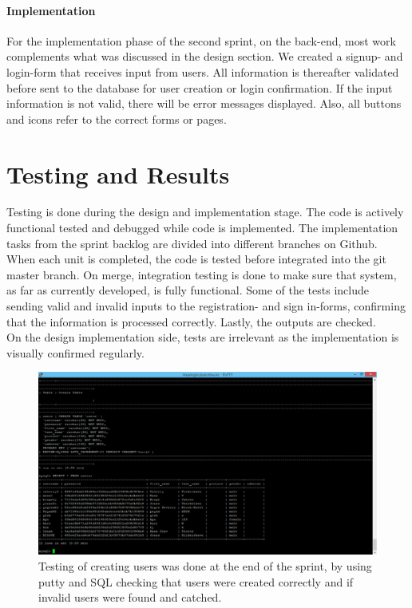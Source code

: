 \documentclass[11pt]{report}
\begin{document}
\paragraph{Implementation}
For the implementation phase of the second sprint, on the back-end, most work complements what was discussed in the design section. We created a signup- and login-form that receives input from users. All information is thereafter validated before sent to the database for user creation or login confirmation. If the input information is not valid, there will be error messages displayed. Also, all buttons and icons refer to the correct forms or pages. 

\section{Testing and Results}
Testing is done during the design and implementation stage. The code is actively functional tested and debugged while code is implemented. The implementation tasks from the sprint backlog are divided into different branches on Github. When each unit is completed, the code is tested before integrated into the git master branch. On merge, integration testing is done to make sure that system, as far as currently developed, is fully functional. Some of the tests include sending valid and invalid inputs to the registration- and sign in-forms, confirming that the information is processed correctly. Lastly, the outputs are checked. \\
On the design implementation side, tests are irrelevant as the implementation is visually confirmed regularly. 

\begin{figure}[ht!]
\centering
\includegraphics[width={\linewidth}]{img/Sprint2-testing.png}
\caption{ Testing of creating users was done at the end of the sprint, by using putty and SQL checking that users were created correctly and if invalid users were found and catched. \label{overflow}}
\end{figure}
\end{document}
